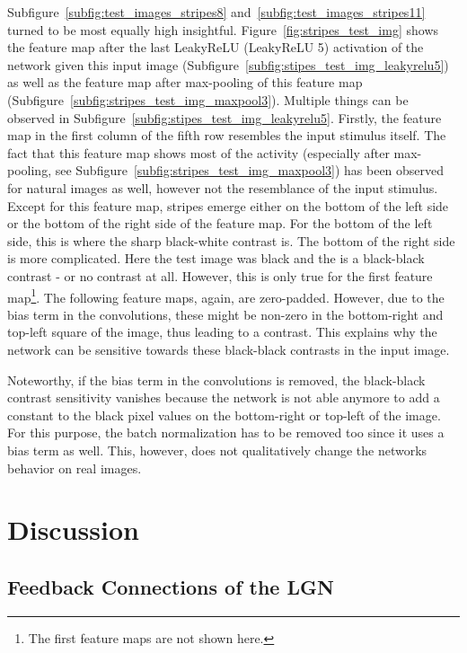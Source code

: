 \documentclass[11pt]{article}
\begin{document}
    Subfigure~\ref{subfig:test_images_stripes8} and~\ref{subfig:test_images_stripes11} turned to be most equally high insightful.
    Figure~\ref{fig:stripes_test_img} shows the feature map after the last LeakyReLU (LeakyReLU 5) activation of the network given this input image (Subfigure~\ref{subfig:stipes_test_img_leakyrelu5}) as well as the feature map after max-pooling of this feature map (Subfigure~\ref{subfig:stripes_test_img_maxpool3}).
    Multiple things can be observed in Subfigure~\ref{subfig:stipes_test_img_leakyrelu5}.
    Firstly, the feature map in the first column of the fifth row resembles the input stimulus itself.
    The fact that this feature map shows most of the activity (especially after max-pooling, see Subfigure~\ref{subfig:stripes_test_img_maxpool3}) has been observed for natural images as well, however not the resemblance of the input stimulus.
    Except for this feature map, stripes emerge either on the bottom of the left side or the bottom of the right side of the feature map.
    For the bottom of the left side, this is where the sharp black-white contrast is.
    The bottom of the right side is more complicated.
    Here the test image was black and the  is a black-black contrast - or no contrast at all.
    However, this is only true for the first feature map\footnote{The first feature maps are not shown here.}.
    The following feature maps, again, are zero-padded.
    However, due to the bias term in the convolutions, these might be non-zero in the bottom-right and top-left square of the image, thus leading to a contrast.
    This explains why the network can be sensitive towards these black-black contrasts in the input image.

    Noteworthy, if the bias term in the convolutions is removed, the black-black contrast sensitivity vanishes because the network is not able anymore to add a constant to the black pixel values on the bottom-right or top-left of the image.
    For this purpose, the batch normalization has to be removed too since it uses a bias term as well.
    This, however, does not qualitatively change the networks behavior on real images.


    \section{Discussion}\label{sec:discussion}

    \subsection{Feedback Connections of the \acl{LGN}}\label{subsec:feedback-connections-of-the-lateral-geniculate-nucleus}
\end{document}

